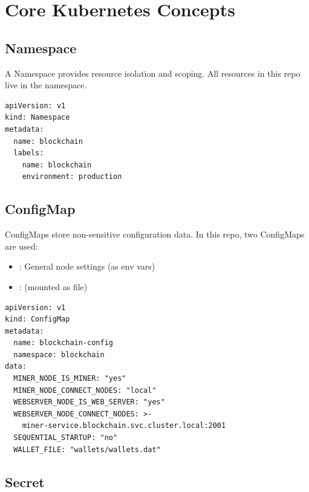 \section{Core Kubernetes Concepts}
\label{sec:k8s-concepts}

\subsection{Namespace}

A Namespace provides resource isolation and scoping. All resources in this repo live in the  namespace.

\begin{listing}[htbp]
\caption{Namespace Definition}
\label{lst:ch23-namespace}
\begin{verbatim}
apiVersion: v1
kind: Namespace
metadata:
  name: blockchain
  labels:
    name: blockchain
    environment: production
\end{verbatim}
\end{listing}

\subsection{ConfigMap}

ConfigMaps store non-sensitive configuration data. In this repo, two ConfigMaps are used:
\begin{itemize}
  \item {}: General node settings (as env vars)
  \item {}:  (mounted as file)
\end{itemize}

\begin{listing}[htbp]
\caption{ConfigMap for Node Settings}
\label{lst:ch23-configmap}
\begin{verbatim}
apiVersion: v1
kind: ConfigMap
metadata:
  name: blockchain-config
  namespace: blockchain
data:
  MINER_NODE_IS_MINER: "yes"
  MINER_NODE_CONNECT_NODES: "local"
  WEBSERVER_NODE_IS_WEB_SERVER: "yes"
  WEBSERVER_NODE_CONNECT_NODES: >-
    miner-service.blockchain.svc.cluster.local:2001
  SEQUENTIAL_STARTUP: "no"
  WALLET_FILE: "wallets/wallets.dat"
\end{verbatim}
\end{listing}

\subsection{Secret}

